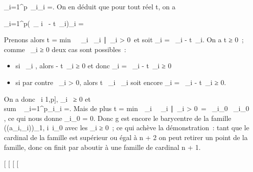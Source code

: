 \documentclass[]{article}
\begin{document}
\_i=1^p\lambda~\_i\overrightarrowga\_i
=. On en déduit que pour tout réel
t, on a

\sum \_i=1^p(\lambda~\_ i~ -
t\alpha~\_i)\overrightarrowga\_i
=

Prenons alors t = min~\
\lambda~\_i \over \alpha~\_i
∣\alpha~\_i \textgreater{}
0\ et soit \mu\_i = \lambda~\_i - t\alpha~\_i.
On a t ≥ 0~; comme \lambda~\_i ≥ 0 deux cas sont possibles~:

\begin{itemize}
\itemsep1pt\parskip0pt
\item
  si \alpha~\_i , alors - t\alpha~\_i ≥ 0 et donc \mu\_i =
  \lambda~\_i - t\alpha~\_i ≥ 0
\item
  si par contre \alpha~\_i \textgreater{} 0, alors t \leq \lambda~\_i
  \over \alpha~\_i soit encore \mu\_i =
  \lambda~\_i - t\alpha~\_i ≥ 0.
\end{itemize}

On a donc \forall~i \in {[}1,p{]}, \mu\_i~ ≥ 0 et
\\sum ~
\_i=1^p\mu\_i\overrightarrowga\_i
=. Mais de plus t
= min\ \lambda~\_i~
\over \alpha~\_i
∣\alpha~\_i \textgreater{}
0\ = \lambda~\_i\_0 \over
\alpha~\_i\_0 , ce qui nous donne \mu\_i\_0 =
0. Donc g est encore le barycentre de la famille \left
((a\_i,\mu\_i)\right )\_1\leqi\leqp,
i\neq~i\_0 avec les \mu\_i ≥ 0~;
ce qui achève la démonstration~: tant que le cardinal de la famille est
supérieur ou égal à n + 2 on peut retirer un point de la famille, donc
on finit par aboutir à une famille de cardinal n + 1.

{[}
{[}
{[}
{[}
\end{document}
